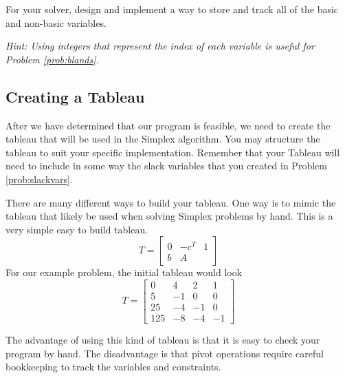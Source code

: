 \begin{problem}
For your solver, design and implement a way to store and track all of the basic and non-basic variables.

\emph{Hint: Using integers that represent the index of each variable is useful for Problem \ref{prob:blands}.}
\label{prob:slackvars}
\end{problem}

\subsection{Creating a Tableau}
After we have determined that our program is feasible, we need to create the tableau that will be used in the Simplex algorithm.
You may structure the tableau to suit your specific implementation.
Remember that your Tableau will need to include in some way the slack variables that you created in Problem \ref{prob:slackvars}.

There are many different ways to build your tableau.
One way is to mimic the tableau that likely be used when solving Simplex problems by hand.
This is a very simple easy to build tableau.
\begin{equation}
T = \begin{bmatrix}
    0 & -c^T & 1  \\
    b & A 
    \end{bmatrix}
\label{eqn:hand_tab}
\end{equation}
For our example problem, the initial tableau would look
\begin{equation*}
T = \begin{bmatrix}
    0 & 4 & 2 & 1 \\
    5 & -1 & 0 & 0 \\
    25 & -4 & -1 & 0 \\
    125 & -8 & -4 & -1
    \end{bmatrix}
\end{equation*}

The advantage of using this kind of tableau is that it is easy to check your program by hand.
The disadvantage is that pivot operations require careful bookkeeping to track the variables and constraints.


